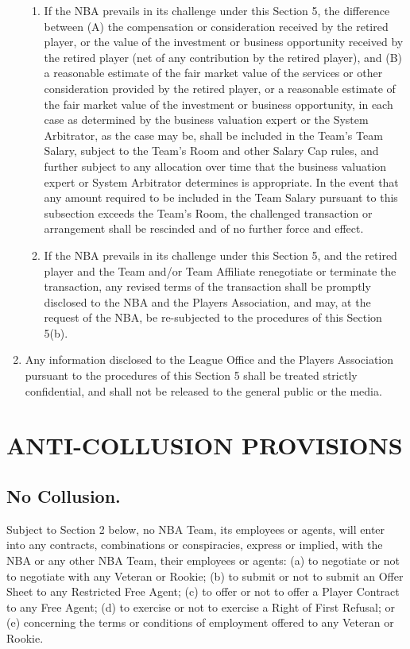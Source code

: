 \documentclass[
]{book}
\begin{document}
\begin{enumerate}
\begin{enumerate}
  \item
    If the NBA prevails in its challenge under this Section 5, the difference between (A) the compensation or consideration received by the retired player, or the value of the investment or business opportunity received by the retired player (net of any contribution by the retired player), and (B) a reasonable estimate of the fair market value of the services or other consideration provided by the retired player, or a reasonable estimate of the fair market value of the investment or business opportunity, in each case as determined by the business valuation expert or the System Arbitrator, as the case may be, shall be included in the Team's Team Salary, subject to the Team's Room and other Salary Cap rules, and further subject to any allocation over time that the business valuation expert or System Arbitrator determines is appropriate. In the event that any amount required to be included in the Team Salary pursuant to this subsection exceeds the Team's Room, the challenged transaction or arrangement shall be rescinded and of no further force and effect.
  \item
    If the NBA prevails in its challenge under this Section 5, and the retired player and the Team and/or Team Affiliate renegotiate or terminate the transaction, any revised terms of the transaction shall be promptly disclosed to the NBA and the Players Association, and may, at the request of the NBA, be re-subjected to the procedures of this Section 5(b).
  \end{enumerate}
\item
  Any information disclosed to the League Office and the Players Association pursuant to the procedures of this Section 5 shall be treated strictly confidential, and shall not be released to the general public or the media.
\end{enumerate}

\hypertarget{anti-collusion-provisions}{%
\chapter{ANTI-COLLUSION PROVISIONS}\label{anti-collusion-provisions}}

\hypertarget{no-collusion.}{%
\section{No Collusion.}\label{no-collusion.}}

Subject to Section 2 below, no NBA Team, its employees or agents, will enter into any contracts, combinations or conspiracies, express or implied, with the NBA or any other NBA Team, their employees or agents: (a) to negotiate or not to negotiate with any Veteran or Rookie; (b) to submit or not to submit an Offer Sheet to any Restricted Free Agent; (c) to offer or not to offer a Player Contract to any Free Agent; (d) to exercise or not to exercise a Right of First Refusal; or (e) concerning the terms or conditions of employment offered to any Veteran or Rookie.
\end{document}
